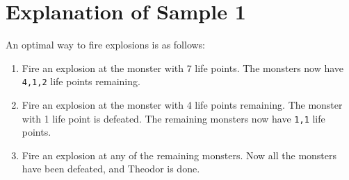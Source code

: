 \section*{Explanation of Sample 1}
An optimal way to fire explosions is as follows:  
\begin{enumerate}  
  \item Fire an explosion at the monster with 7 life points. The monsters now have \verb+4,1,2+ life points remaining.
  \item Fire an explosion at the monster with 4 life points remaining. The monster with 1 life point is defeated.
  The remaining monsters now have \verb+1,1+ life points.  
  \item Fire an explosion at any of the remaining monsters. Now all the monsters have been defeated,
  and Theodor is done.
\end{enumerate}
